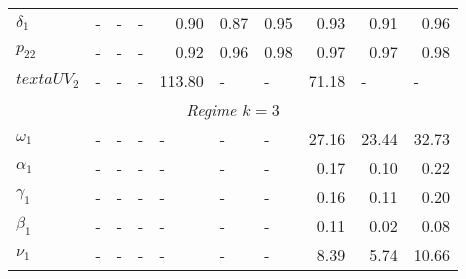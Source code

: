 \documentclass[12pt,a4paper]{article}
\begin{document}
\begin{table}[htbp]
\begin{threeparttable}
\begin{tabular}{llllrrrrrr}
$\delta_1$     & -                                 & -                               & -                               & 0.90                  & 0.87                  & 0.95                  & 0.93          & 0.91                  & 0.96                  \\
$p_22$         & -                                 & -                               & -                               & 0.92                  & 0.96                  & 0.98                  & 0.97          & 0.97                  & 0.98                  \\
$text{aUV}_2$  & -                                 & -                               & -                               & 113.80                & \multicolumn{1}{l}{-} & \multicolumn{1}{l}{-} & 71.18         & \multicolumn{1}{l}{-} & \multicolumn{1}{l}{-} \\
\multicolumn{10}{c}{\textit{Regime $k=3$}}                                                                                                                                                                                                                     \\
$\omega_1$     & -                                 & -                               & -                               & \multicolumn{1}{l}{-} & \multicolumn{1}{l}{-} & \multicolumn{1}{l}{-} & 27.16         & 23.44                 & 32.73                 \\
$\alpha_1$     & -                                 & -                               & -                               & \multicolumn{1}{l}{-} & \multicolumn{1}{l}{-} & \multicolumn{1}{l}{-} & 0.17          & 0.10                  & 0.22                  \\
$\gamma_1$     & -                                 & -                               & -                               & \multicolumn{1}{l}{-} & \multicolumn{1}{l}{-} & \multicolumn{1}{l}{-} & 0.16          & 0.11                  & 0.20                  \\
$\beta_1$      & -                                 & -                               & -                               & \multicolumn{1}{l}{-} & \multicolumn{1}{l}{-} & \multicolumn{1}{l}{-} & 0.11          & 0.02                  & 0.08                  \\
$\nu_1$        & -                                 & -                               & -                               & \multicolumn{1}{l}{-} & \multicolumn{1}{l}{-} & \multicolumn{1}{l}{-} & 8.39          & 5.74                  & 10.66                 \\

\end{tabular}
\end{threeparttable}
\end{table}
\end{document}
